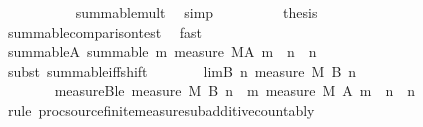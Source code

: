 \begin{isabellebody}
\ \ \ \ \ \ \ \ \isamarkupfalse%
\ {}\ summable{\isacharunderscore}{\kern0pt}mult\ \isamarkupfalse%
\ simp\isanewline
\ \ \ \ \ \ \isamarkupfalse%
\ \isamarkupfalse%
\ {\isacharquery}{\kern0pt}thesis\isanewline
\ \ \ \ \ \ \ \ \isamarkupfalse%
\ summable{\isacharunderscore}{\kern0pt}comparison{\isacharunderscore}{\kern0pt}test{\isacharprime}{\kern0pt}\ \isamarkupfalse%
\ fast\isanewline
\ \ \ \ \isamarkupfalse%
\isanewline
\ \ \ \ \isamarkupfalse%
\ \isamarkupfalse%
\ summable{\isacharunderscore}{\kern0pt}A{\isacharcolon}{\kern0pt}\ {\isachardoublequoteopen}summable\ {\isacharparenleft}{\kern0pt}{\isasymlambda}m{\isachardot}{\kern0pt}\ measure\ {\isacharquery}{\kern0pt}M{\isacharparenleft}{\kern0pt}A\ {\isacharparenleft}{\kern0pt}m\ {\isacharplus}{\kern0pt}\ n{\isacharparenright}{\kern0pt}{\isacharparenright}{\kern0pt}{\isacharparenright}{\kern0pt}{\isachardoublequoteclose}\ \ n\isanewline
\ \ \ \ \ \ \isamarkupfalse%
\ {\isacharparenleft}{\kern0pt}subst\ summable{\isacharunderscore}{\kern0pt}iff{\isacharunderscore}{\kern0pt}shift{\isacharparenright}{\kern0pt}\isanewline
\ \ \ \ \isamarkupfalse%
\ \isamarkupfalse%
\ lim{\isacharunderscore}{\kern0pt}B{\isacharcolon}{\kern0pt}\ {\isachardoublequoteopen}{\isacharparenleft}{\kern0pt}{\isasymlambda}n{\isachardot}{\kern0pt}\ measure\ {\isacharquery}{\kern0pt}M\ {\isacharparenleft}{\kern0pt}{\isacharquery}{\kern0pt}B\ n{\isacharparenright}{\kern0pt}{\isacharparenright}{\kern0pt}\ {\isasymlonglonglongrightarrow}\ {}{\isachardoublequoteclose}\isanewline
\ \ \ \ \isamarkupfalse%
\ {\isacharminus}{\kern0pt}\ \ \ \ \ \ \ \ \isanewline
\ \ \ \ \ \ \isamarkupfalse%
\ measure{\isacharunderscore}{\kern0pt}B{\isacharunderscore}{\kern0pt}le{\isacharcolon}{\kern0pt}\ {\isachardoublequoteopen}measure\ {\isacharquery}{\kern0pt}M\ {\isacharparenleft}{\kern0pt}{\isacharquery}{\kern0pt}B\ n{\isacharparenright}{\kern0pt}\ {\isasymle}\ {\isacharparenleft}{\kern0pt}{\isasymSum}m{\isachardot}{\kern0pt}\ measure\ {\isacharquery}{\kern0pt}M\ {\isacharparenleft}{\kern0pt}A\ {\isacharparenleft}{\kern0pt}m\ {\isacharplus}{\kern0pt}\ n{\isacharparenright}{\kern0pt}{\isacharparenright}{\kern0pt}{\isacharparenright}{\kern0pt}{\isachardoublequoteclose}\ \ n\isanewline
\ \ \ \ \ \ \ \ \isamarkupfalse%
\ {\isacharparenleft}{\kern0pt}rule\ proc{\isacharunderscore}{\kern0pt}source{\isachardot}{\kern0pt}finite{\isacharunderscore}{\kern0pt}measure{\isacharunderscore}{\kern0pt}subadditive{\isacharunderscore}{\kern0pt}countably{\isacharparenright}{\kern0pt}\isanewline

\end{isabellebody}
